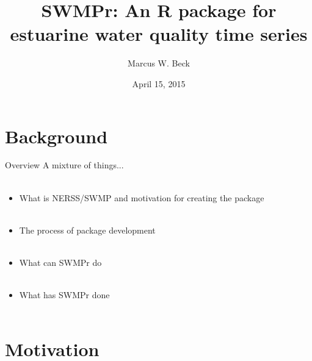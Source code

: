 \documentclass[serif]{beamer}\usepackage[]{graphicx}\usepackage[]{color}
\begin{document}
\title[SWMPr for estuarine time series]{SWMPr: An R package for estuarine water quality time series}

\author[M. Beck]{Marcus W. Beck}

\date{April 15, 2015}



\begin{frame}
\titlepage
\end{frame}

\section{Background}

\begin{frame}{Overview}
A mixture of things...\\~\\
\begin{itemize}
\item What is NERSS/SWMP and motivation for creating the package \\~\\
\item The process of package development \\~\\
\item What can SWMPr do \\~\\
\item What has SWMPr done \\~\\
\end{itemize}
\end{frame}

\section{Motivation}
\end{document}
